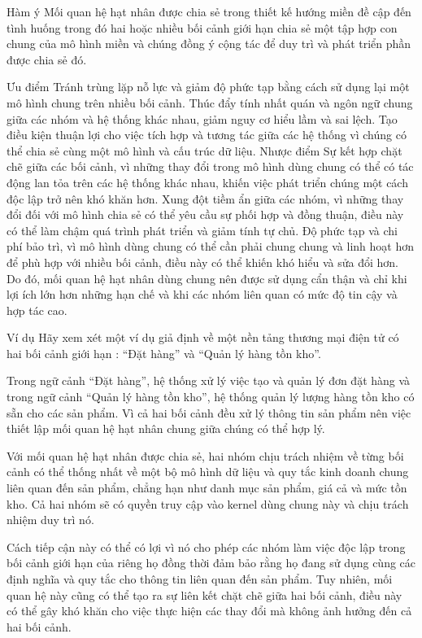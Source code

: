 Hàm ý
Mối quan hệ hạt nhân được chia sẻ trong thiết kế hướng miền đề cập đến tình huống trong đó hai hoặc nhiều bối cảnh giới hạn chia sẻ một tập hợp con chung của mô hình miền và chúng đồng ý cộng tác để duy trì và phát triển phần được chia sẻ đó.

Ưu điểm
Tránh trùng lặp nỗ lực và giảm độ phức tạp bằng cách sử dụng lại một mô hình chung trên nhiều bối cảnh.
Thúc đẩy tính nhất quán và ngôn ngữ chung giữa các nhóm và hệ thống khác nhau, giảm nguy cơ hiểu lầm và sai lệch.
Tạo điều kiện thuận lợi cho việc tích hợp và tương tác giữa các hệ thống vì chúng có thể chia sẻ cùng một mô hình và cấu trúc dữ liệu.
Nhược điểm
Sự kết hợp chặt chẽ giữa các bối cảnh, vì những thay đổi trong mô hình dùng chung có thể có tác động lan tỏa trên các hệ thống khác nhau, khiến việc phát triển chúng một cách độc lập trở nên khó khăn hơn.
Xung đột tiềm ẩn giữa các nhóm, vì những thay đổi đối với mô hình chia sẻ có thể yêu cầu sự phối hợp và đồng thuận, điều này có thể làm chậm quá trình phát triển và giảm tính tự chủ.
Độ phức tạp và chi phí bảo trì, vì mô hình dùng chung có thể cần phải chung chung và linh hoạt hơn để phù hợp với nhiều bối cảnh, điều này có thể khiến khó hiểu và sửa đổi hơn.
Do đó, mối quan hệ hạt nhân dùng chung nên được sử dụng cẩn thận và chỉ khi lợi ích lớn hơn những hạn chế và khi các nhóm liên quan có mức độ tin cậy và hợp tác cao.

Ví dụ
Hãy xem xét một ví dụ giả định về một nền tảng thương mại điện tử có hai bối cảnh giới hạn : “Đặt hàng” và “Quản lý hàng tồn kho”.

Trong ngữ cảnh “Đặt hàng”, hệ thống xử lý việc tạo và quản lý đơn đặt hàng và trong ngữ cảnh “Quản lý hàng tồn kho”, hệ thống quản lý lượng hàng tồn kho có sẵn cho các sản phẩm. Vì cả hai bối cảnh đều xử lý thông tin sản phẩm nên việc thiết lập mối quan hệ hạt nhân chung giữa chúng có thể hợp lý.

Với mối quan hệ hạt nhân được chia sẻ, hai nhóm chịu trách nhiệm về từng bối cảnh có thể thống nhất về một bộ mô hình dữ liệu và quy tắc kinh doanh chung liên quan đến sản phẩm, chẳng hạn như danh mục sản phẩm, giá cả và mức tồn kho. Cả hai nhóm sẽ có quyền truy cập vào kernel dùng chung này và chịu trách nhiệm duy trì nó.

Cách tiếp cận này có thể có lợi vì nó cho phép các nhóm làm việc độc lập trong bối cảnh giới hạn của riêng họ đồng thời đảm bảo rằng họ đang sử dụng cùng các định nghĩa và quy tắc cho thông tin liên quan đến sản phẩm. Tuy nhiên, mối quan hệ này cũng có thể tạo ra sự liên kết chặt chẽ giữa hai bối cảnh, điều này có thể gây khó khăn cho việc thực hiện các thay đổi mà không ảnh hưởng đến cả hai bối cảnh.

